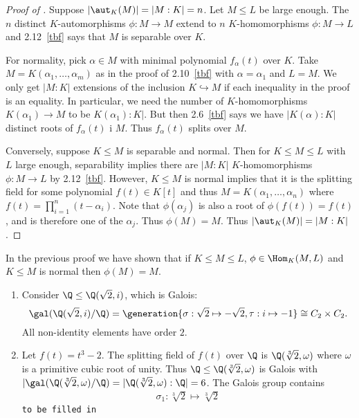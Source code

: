 \documentclass[a4paper]{article}
\begin{document}
\begin{proof}[Proof of ]
  Suppose \(|\aut_K(M)| = |M:K| = n\). Let \(M \leq L\) be large enough. The \(n\) distinct \(K\)-automorphisms \(\phi: M \to M\) extend to \(n\) \(K\)-homomorphisms \(\phi: M \to L\) and 2.12~\ref{tbf} says that \(M\) is separable over \(K\).

  For normality, pick \(\alpha \in M\) with minimal polynomial \(f_\alpha(t)\) over \(K\). Take \(M = K(\alpha_1, \dots, \alpha_m)\) as in the proof of 2.10~\ref{tbf} with \(\alpha = \alpha_1\) and \(L = M\). We only get \(|M:K|\) extensions of the inclusion \(K \hookrightarrow M\) if each inequality in the proof is an equality. In particular, we need the number of \(K\)-homomorphisms \(K(\alpha_1) \to M\) to be \(K(\alpha_1):K|\). But then 2.6~\ref{tbf} says we have \(|K(\alpha):K|\) distinct roots of \(f_\alpha(t)\) i \(M\). Thus \(f_\alpha(t)\) splits over \(M\).

  Conversely, suppose \(K \leq M\) is separable and normal. Then for \(K \leq M \leq L\) with \(L\) large enough, separability implies there are \(|M:K|\) \(K\)-homomorphisms \(\phi: M \to L\) by 2.12~\ref{tbf}. However, \(K \leq M\) is normal implies that it is the splitting field for some polynomial \(f(t) \in K[t]\) and thus \(M = K(\alpha_1, \dots, \alpha_n)\) where \(f(t) = \prod_{i = 1}^n (t - \alpha_i)\). Note that \(\phi(\alpha_j)\) is also a root of \(\phi(f(t)) = f(t)\), and is therefore one of the \(\alpha_j\). Thus \(\phi(M) = M\). Thus \(|\aut_K(M)| = |M:K|\).
\end{proof}

\begin{remark}
  In the previous proof we have shown that if \(K \leq M \leq L\), \(\phi \in \Hom_K(M, L)\) and \(K \leq M\) is normal then \(\phi(M) = M\).
\end{remark}

\begin{eg}\leavevmode
  \begin{enumerate}
  \item Consider \(\Q \leq \Q(\sqrt 2, i)\), which is Galois:
    \[
      \gal(\Q(\sqrt 2, i)/\Q) = \generation{\sigma: \sqrt 2 \mapsto -\sqrt 2, \tau: i \mapsto -1} \cong C_2 \times C_2.
    \]
    All non-identity elements have order \(2\).
  \item Let \(f(t) = t^3 - 2\). The splitting field of \(f(t)\) over \(\Q\) is \(\Q(\sqrt[3]{2}, \omega)\) where \(\omega\) is a primitive cubic root of unity. Thus \(\Q \leq \Q(\sqrt[3]{2}, \omega)\) is Galois with \(|\gal(\Q(\sqrt[3]{2}, \omega)/\Q) = |\Q(\sqrt[3]{2}, \omega):\Q| = 6\). The Galois group contains
    \begin{align*}
      \sigma_1: \sqrt[3]{2} \mapsto \sqrt[3]{2} %
    \end{align*}
    \texttt{to be filled in}
  \end{enumerate}
\end{eg}
\end{document}
